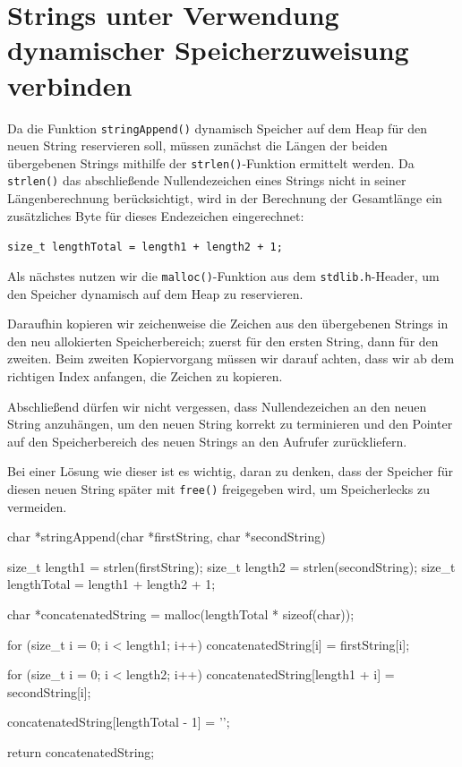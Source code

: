 \chapter{Strings unter Verwendung dynamischer Speicherzuweisung verbinden}

Da die Funktion \texttt{stringAppend()} dynamisch Speicher auf dem Heap
für den neuen String reservieren soll, müssen zunächst die Längen der beiden
übergebenen Strings mithilfe der \texttt{strlen()}-Funktion ermittelt
werden. Da \texttt{strlen()} das abschließende Nullendezeichen eines
Strings nicht in seiner Längenberechnung berücksichtigt, wird in der Berechnung
der Gesamtlänge ein zusätzliches Byte für dieses Endezeichen eingerechnet:

\texttt{size_t lengthTotal = length1 + length2 + 1;}

Als nächstes nutzen wir die \texttt{malloc()}-Funktion aus dem
\texttt{stdlib.h}-Header, um den Speicher dynamisch auf dem Heap zu
reservieren.

Daraufhin kopieren wir zeichenweise die Zeichen aus den übergebenen Strings in
den neu allokierten Speicherbereich; zuerst für den ersten String, dann für den
zweiten. Beim zweiten Kopiervorgang müssen wir darauf achten, dass wir ab dem
richtigen Index anfangen, die Zeichen zu kopieren.

Abschließend dürfen wir nicht vergessen, dass Nullendezeichen an den neuen
String anzuhängen, um den neuen String korrekt zu terminieren und den Pointer
auf den Speicherbereich des neuen Strings an den Aufrufer zurückliefern.

Bei einer Lösung wie dieser ist es wichtig, daran zu denken, dass der Speicher
für diesen neuen String später mit \texttt{free()} freigegeben wird, um
Speicherlecks zu vermeiden.

\begin{codebox}[lang=c, fontsize=\small]
char *stringAppend(char *firstString, char *secondString) {
    size_t length1 = strlen(firstString);
    size_t length2 = strlen(secondString);
    size_t lengthTotal = length1 + length2 + 1;

    char *concatenatedString = malloc(lengthTotal * sizeof(char));

    for (size_t i = 0; i < length1; i++)
        concatenatedString[i] = firstString[i];

    for (size_t i = 0; i < length2; i++)
        concatenatedString[length1 + i] = secondString[i];

    concatenatedString[lengthTotal - 1] = '\0';

    return concatenatedString;
}
\end{codebox}






